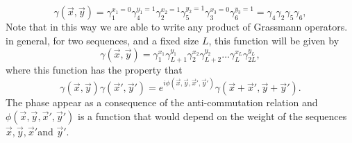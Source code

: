 \begin{equation}
\gamma(\vec{x},\vec{y}) = \gamma_1^{x_1=0} \gamma_{4}^{y_1=1} \gamma_{2}^{x_2=1} \gamma_{5}^{y_2=1} \gamma_{3}^{x_3=0} \gamma_{6}^{y_3=1} = \gamma_{4}\gamma_{2}\gamma_{5}\gamma_{6},
\end{equation}
Note that in this way we are able to write any product of Grassmann operators. in general, for two sequences, and a fixed size $L$, this function will be given by
\begin{equation}
\gamma(\vec{x},\vec{y}) = \gamma_1^{x_1} \gamma_{L+1}^{y_1} \gamma_{2}^{x_2} \gamma_{L+2}^{y_2}\ldots \gamma_{L}^{x_L} \gamma_{2L}^{y_L},
\end{equation} 
where this function has the property that
\begin{equation}
\gamma(\vec{x},\vec{y})\gamma(\vec{x}',\vec{y}') = e^{i\phi(\vec{x},\vec{y},\vec{x}',\vec{y}')} \gamma(\vec{x}+\vec{x}',\vec{y}+\vec{y}').
\label{CH2:my_relation_delta}
\end{equation}
The phase appear as a consequence of the anti-commutation relation and $\phi(\vec{x},\vec{y},\vec{x}',\vec{y}')$ is a function that would depend on the weight of the sequences $\vec{x},\vec{y},\vec{x}'$and $\vec{y}'$.\\

